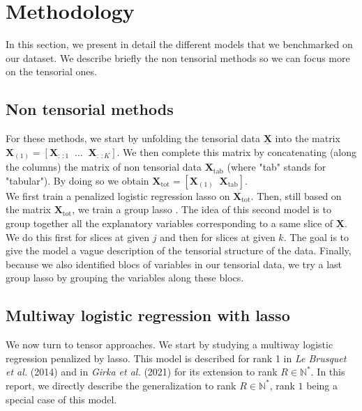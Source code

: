 \documentclass[10pt]{article}
\begin{document}
\section{Methodology}
\noindent In this section, we present in detail the different models that we benchmarked on our dataset. We describe briefly the non tensorial methods so we can focus more on the tensorial ones.
\subsection{Non tensorial methods}
For these methods, we start by unfolding the tensorial data $\underline{\mathbf{X}}$ into the matrix $\mathbf{X}_{(1)} = [\mathbf{X}_{:\,:1}\; \; \ldots \; \;\mathbf{X}_{:\,:K}]$. We then complete this matrix  by concatenating (along the columns) the matrix of non tensorial data $\mathbf{X}_{\text{tab}}$ (where "tab" stands for "tabular"). By doing so we obtain $\mathbf{X}_{\text{tot}} = [\mathbf{X}_{(1)} \; \; \mathbf{X}_{\text{tab}}]$.\\
\indent We first train a penalized logistic regression lasso on $\mathbf{X}_{\text{tot}}$. Then, still based on the matrix $\mathbf{X}_{\text{tot}}$, we train a group lasso \cite{grp_lasso}. The idea of this second model is to group together all the explanatory variables corresponding to a same slice of $\underline{\mathbf{X}}$. We do this first for slices at given $j$ and then for slices at given $k$.  The goal is to give the model a vague description of the tensorial structure of the data. Finally, because we also identified blocs of variables in our tensorial data, we try a last group lasso by grouping the variables along these blocs.

\subsection{Multiway logistic regression with lasso}
\indent We now turn to tensor approaches. We start by studying a multiway logistic regression penalized by lasso. This model is described for rank 1 in \textit{Le Brusquet et al.} (2014) \cite{multi_rank_1} and in \textit{Girka et al.} (2021) \cite{multi_rank_r} for its extension to rank $R \in \mathbb{N}^{*}$. In this report, we directly describe the generalization to rank $R \in \mathbb{N}^{*}$, rank $1$ being a special case of this model.\\[5 pt]
\end{document}
